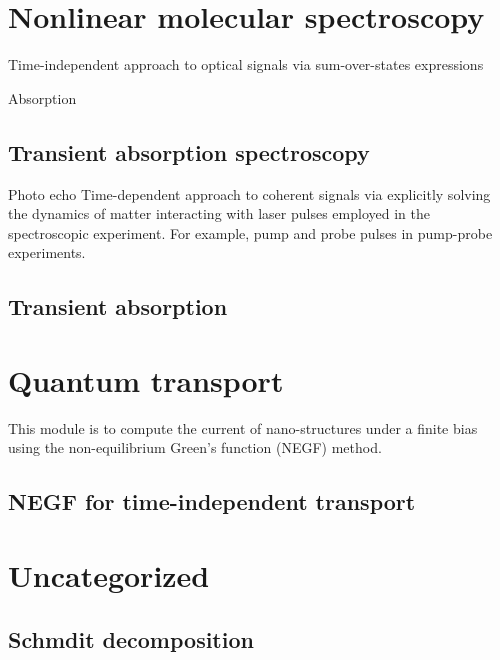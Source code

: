 \documentclass[a4paper,12pt]{book}
\begin{document}
\chapter{Nonlinear molecular spectroscopy}
Time-independent approach to optical signals via sum-over-states expressions

Absorption
\section{Transient absorption spectroscopy}
Photo echo
Time-dependent approach to coherent signals via explicitly solving the dynamics of matter interacting with laser pulses employed in the spectroscopic experiment. For example, pump and probe pulses in pump-probe experiments.

\section{Transient absorption}

\chapter{ Quantum transport}
This module is to compute the current of nano-structures under a finite bias using the non-equilibrium Green's function (NEGF) method.

\section{NEGF for time-independent transport}


\chapter{Uncategorized}

\section{Schmdit decomposition}


\backmatter
\end{document}
